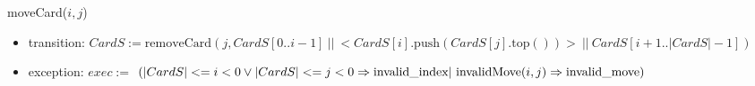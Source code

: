 \documentclass[12pt,fleqn]{article}
\begin{document}
\noindent moveCard($\mathit{i, j}$)
\begin{itemize}
\item transition: $CardS := \mbox{removeCard}(j, CardS[0..i - 1]\ ||\ <CardS[i].\mbox{push}(CardS[j].\mbox{top}())>\ ||\ CardS[i+1..|CardS| -1])$\\
\item exception: $exec :=$  $(|CardS| <= i < 0  \lor |CardS| <= j < 0 \Rightarrow \mbox{invalid\_index} \\ |\ \mbox{invalidMove}(i, j) \Rightarrow \mbox{invalid\_move})$


\end{itemize}



%
%
\end{document}
